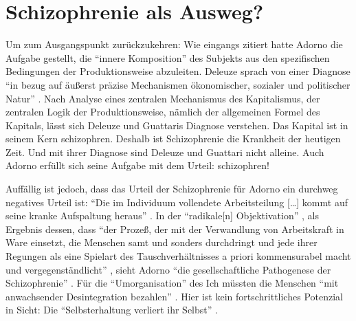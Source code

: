 \documentclass[12pt,
               paper=a4,
               twoside=false,
               onehalfspacing,
               bibliography=totoc,
               toc=graduated,
               ]{scrartcl}
\newcommand{\lips}{\dots\unkern}
\newcommand{\pc}[2]{\parencite[#1]{#2}}
\newcommand{\worries}[1]{\ifdraft{\textcolor{blue}{\texttt{(#1)}}}{}}
\newcommand{\dg}{Deleuze und Guattari\xspace}
\begin{document}


%



\section{Schizophrenie als Ausweg?}

Um zum Ausgangspunkt zurückzukehren: Wie eingangs zitiert hatte Adorno
die Aufgabe gestellt, die "`innere Komposition"' \pc{261}{min} des
Subjekts aus den spezifischen Bedingungen der Produktionsweise
abzuleiten. Deleuze sprach von einer Diagnose "`in bezug auf äußerst
präzise Mechanismen ökonomischer, sozialer und politischer Natur"'
\pc{28}{schizg}. Nach Analyse eines zentralen Mechanismus des
Kapitalismus, der zentralen Logik der Produktionsweise, nämlich der
allgemeinen Formel des Kapitals, lässt sich Deleuze und Guattaris
Diagnose verstehen. Das Kapital ist in seinem Kern schizophren.
Deshalb ist Schizophrenie die Krankheit der heutigen Zeit. Und mit
ihrer Diagnose sind \dg nicht alleine. Auch Adorno erfüllt sich seine
Aufgabe mit dem Urteil: schizophren!

Auffällig ist jedoch, dass das Urteil der Schizophrenie für Adorno ein
durchweg negatives Urteil ist: "`Die im Individuum vollendete
Arbeitsteilung [\lips] kommt auf seine kranke Aufspaltung heraus"'
\pc{263}{min}. In der "`radikale[n] Objektivation"' \pc{263}{min}, als
Ergebnis dessen, dass "`der Prozeß, der mit der Verwandlung von
Arbeitskraft in Ware einsetzt, die Menschen samt und sonders
durchdringt und jede ihrer Regungen als eine Spielart des
Tauschverhältnisses a priori kommensurabel macht und
vergegenständlicht"' \pc{262}{min}, sieht Adorno "`die
gesellschaftliche Pathogenese der Schizophrenie"' \pc{263}{min}. Für
die "`Umorganisation"' \pc{263}{min} des Ich müssten die Menschen
"`mit anwachsender Desintegration bezahlen"' \pc{263}{min}. Hier ist
kein fortschrittliches Potenzial in Sicht: Die "`Selbsterhaltung
verliert ihr Selbst"' \pc{263}{min}.
\end{document}
